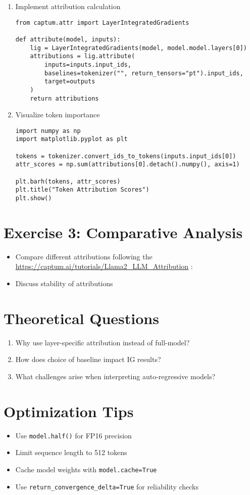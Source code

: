 \begin{enumerate}
\item Implement attribution calculation
\begin{verbatim}
from captum.attr import LayerIntegratedGradients

def attribute(model, inputs):
    lig = LayerIntegratedGradients(model, model.model.layers[0])
    attributions = lig.attribute(
        inputs=inputs.input_ids,
        baselines=tokenizer("", return_tensors="pt").input_ids,
        target=outputs
    )
    return attributions
\end{verbatim}

\item Visualize token importance
\begin{verbatim}
import numpy as np
import matplotlib.pyplot as plt

tokens = tokenizer.convert_ids_to_tokens(inputs.input_ids[0])
attr_scores = np.sum(attributions[0].detach().numpy(), axis=1)

plt.barh(tokens, attr_scores)
plt.title("Token Attribution Scores")
plt.show()
\end{verbatim}
\end{enumerate}

\section*{Exercise 3: Comparative Analysis}
\begin{itemize}
\item Compare different attributions following the \url{https://captum.ai/tutorials/Llama2_LLM_Attribution} :

\item Discuss stability of attributions
\end{itemize}

\section*{Theoretical Questions}
\begin{enumerate}
\item Why use layer-specific attribution instead of full-model?
\item How does choice of baseline impact IG results?
\item What challenges arise when interpreting auto-regressive models?
\end{enumerate}

\section*{Optimization Tips}
\begin{itemize}
\item Use \texttt{model.half()} for FP16 precision
\item Limit sequence length to 512 tokens
\item Cache model weights with \texttt{model.cache=True}
\item Use \texttt{return\_convergence\_delta=True} for reliability checks
\end{itemize}

